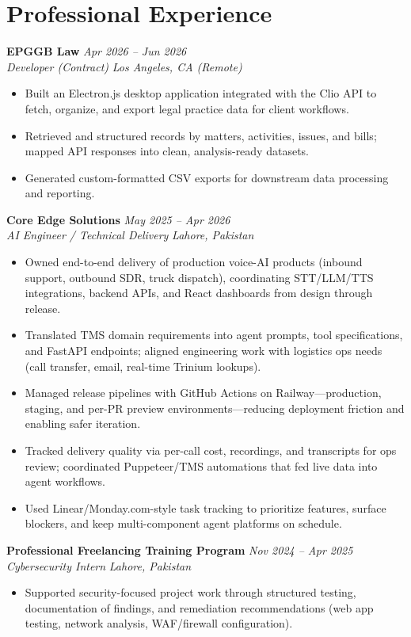 \documentclass[11pt,a4paper]{article}
\newcommand{\resumeSubheading}[4]{%
  \textbf{#1} \hfill \textit{#2} \\
  \textit{#3} \hfill \textit{#4} \\
}
\newcommand{\resumeItemList}{\begin{itemize}[leftmargin=*, nosep, topsep=2pt]}
\newcommand{\resumeItemListEnd}{\end{itemize}}
\begin{document}
\section{Professional Experience}

\resumeSubheading{EPGGB Law}{Apr 2026 -- Jun 2026}{Developer (Contract)}{Los Angeles, CA (Remote)}
\resumeItemList
  \item Built an Electron.js desktop application integrated with the Clio API to fetch, organize, and export legal practice data for client workflows.
  \item Retrieved and structured records by matters, activities, issues, and bills; mapped API responses into clean, analysis-ready datasets.
  \item Generated custom-formatted CSV exports for downstream data processing and reporting.
\resumeItemListEnd

\vspace{4pt}

\resumeSubheading{Core Edge Solutions}{May 2025 -- Apr 2026}{AI Engineer / Technical Delivery}{Lahore, Pakistan}
\resumeItemList
  \item Owned end-to-end delivery of production voice-AI products (inbound support, outbound SDR, truck dispatch), coordinating STT/LLM/TTS integrations, backend APIs, and React dashboards from design through release.
  \item Translated TMS domain requirements into agent prompts, tool specifications, and FastAPI endpoints; aligned engineering work with logistics ops needs (call transfer, email, real-time Trinium lookups).
  \item Managed release pipelines with GitHub Actions on Railway---production, staging, and per-PR preview environments---reducing deployment friction and enabling safer iteration.
  \item Tracked delivery quality via per-call cost, recordings, and transcripts for ops review; coordinated Puppeteer/TMS automations that fed live data into agent workflows.
  \item Used Linear/Monday.com-style task tracking to prioritize features, surface blockers, and keep multi-component agent platforms on schedule.
\resumeItemListEnd

\vspace{4pt}

\resumeSubheading{Professional Freelancing Training Program}{Nov 2024 -- Apr 2025}{Cybersecurity Intern}{Lahore, Pakistan}
\resumeItemList
  \item Supported security-focused project work through structured testing, documentation of findings, and remediation recommendations (web app testing, network analysis, WAF/firewall configuration).
\resumeItemListEnd
\end{document}
